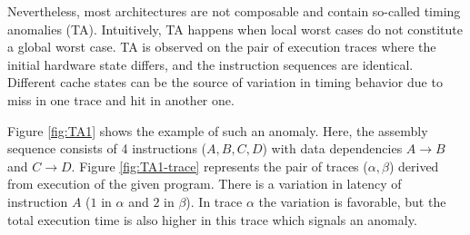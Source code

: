 Nevertheless, most architectures are not composable and contain so-called timing anomalies (TA). Intuitively, TA happens when local worst cases do not constitute a global worst case. TA is observed on the pair of execution traces where the initial hardware state differs, and the instruction sequences are identical. Different cache states can be the source of variation in timing behavior due to miss in one trace and hit in another one.

\begin{example}
Figure \ref{fig:TA1} shows the example of such an anomaly. Here, the assembly sequence consists of 4 instructions ($A,B,C,D$) with data dependencies $A \rightarrow B$ and $C \rightarrow D$. Figure \ref{fig:TA1-trace} represents the pair of traces ($\alpha, \beta$) derived from execution of the given program. There is a variation in latency of instruction $A$ ($1$ in $\alpha$ and $2$ in $\beta$). In trace $\alpha$  the variation is favorable, but the total execution time is also higher in this trace which signals an anomaly.

\label{ex:simple-ta}
\end{example}

